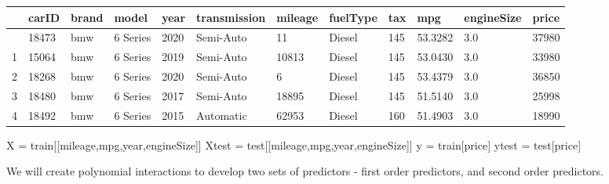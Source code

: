 \documentclass[
  letterpaper,
  DIV=11,
  numbers=noendperiod]{scrreprt}
\newenvironment{Shaded}{\begin{snugshade}}{\end{snugshade}}
\newcommand{\NormalTok}[1]{\textcolor[rgb]{0.00,0.23,0.31}{#1}}
\newcommand{\OperatorTok}[1]{\textcolor[rgb]{0.37,0.37,0.37}{#1}}
\newcommand{\StringTok}[1]{\textcolor[rgb]{0.13,0.47,0.30}{#1}}
\begin{document}
\begin{longtable}[]{@{}llllllllllll@{}}
\toprule\noalign{}
& carID & brand & model & year & transmission & mileage & fuelType & tax
& mpg & engineSize & price \\
\midrule\noalign{}
\endhead
\bottomrule\noalign{}
\endlastfoot
0 & 18473 & bmw & 6 Series & 2020 & Semi-Auto & 11 & Diesel & 145 &
53.3282 & 3.0 & 37980 \\
1 & 15064 & bmw & 6 Series & 2019 & Semi-Auto & 10813 & Diesel & 145 &
53.0430 & 3.0 & 33980 \\
2 & 18268 & bmw & 6 Series & 2020 & Semi-Auto & 6 & Diesel & 145 &
53.4379 & 3.0 & 36850 \\
3 & 18480 & bmw & 6 Series & 2017 & Semi-Auto & 18895 & Diesel & 145 &
51.5140 & 3.0 & 25998 \\
4 & 18492 & bmw & 6 Series & 2015 & Automatic & 62953 & Diesel & 160 &
51.4903 & 3.0 & 18990 \\
\end{longtable}

\begin{Shaded}
\begin{Highlighting}[]
\NormalTok{X }\OperatorTok{=}\NormalTok{ train[[}\StringTok{\textquotesingle{}mileage\textquotesingle{}}\NormalTok{,}\StringTok{\textquotesingle{}mpg\textquotesingle{}}\NormalTok{,}\StringTok{\textquotesingle{}year\textquotesingle{}}\NormalTok{,}\StringTok{\textquotesingle{}engineSize\textquotesingle{}}\NormalTok{]]}
\NormalTok{Xtest }\OperatorTok{=}\NormalTok{ test[[}\StringTok{\textquotesingle{}mileage\textquotesingle{}}\NormalTok{,}\StringTok{\textquotesingle{}mpg\textquotesingle{}}\NormalTok{,}\StringTok{\textquotesingle{}year\textquotesingle{}}\NormalTok{,}\StringTok{\textquotesingle{}engineSize\textquotesingle{}}\NormalTok{]]}
\NormalTok{y }\OperatorTok{=}\NormalTok{ train[}\StringTok{\textquotesingle{}price\textquotesingle{}}\NormalTok{]}
\NormalTok{ytest }\OperatorTok{=}\NormalTok{ test[}\StringTok{\textquotesingle{}price\textquotesingle{}}\NormalTok{]}
\end{Highlighting}
\end{Shaded}

We will create polynomial interactions to develop two sets of predictors
- first order predictors, and second order predictors.
\end{document}
